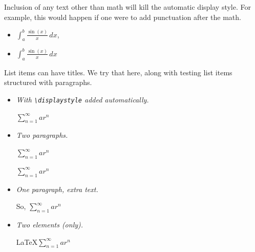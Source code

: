 \documentclass[pdflatex]{sn-jnl}
\theoremstyle{thmstyleone}%
\theoremstyle{thmstyletwo}%
\theoremstyle{thmstylethree}%
\newcommand{\mono}[1]{\texttt{#1}}
\newcommand{\lititle}[1]{{\slshape#1}}
\numberwithin{equation}{section}
\begin{document}
%
\par
Inclusion of any text other than math will kill the automatic display style. For example, this would happen if one were to add punctuation after the math.%
\par
%
\begin{itemize}[label=\textbullet]
\item{}\(\int_a^b \frac{\sin(x)}{x}\,dx\),%
\item{}\(\displaystyle \int_a^b \frac{\sin(x)}{x}\,dx\)%
\end{itemize}
%
\par
List items can have titles.  We try that here, along with testing list items structured with paragraphs.%
\begin{itemize}[label=\textbullet]
\item{}\lititle{With \mono{\textbackslash{}displaystyle} added automatically.}\par%
\(\displaystyle \sum_{n=1}^\infty ar^n\)%
\item{}\lititle{Two paragraphs.}\par%
\(\sum_{n=1}^\infty ar^n\)%
\par
\(\sum_{n=1}^\infty ar^n\)%
\item{}\lititle{One paragraph, extra text.}\par%
So, \(\sum_{n=1}^\infty ar^n\)%
\item{}\lititle{Two elements (only).}\par%
\LaTeX{}\(\sum_{n=1}^\infty ar^n\)%
\end{itemize}
%
%
%
\typeout{************************************************}
\typeout{************************************************}
%
\end{document}
